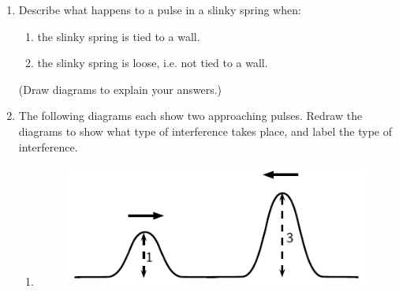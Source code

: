 \begin{enumerate}[noitemsep, label=\textbf{\arabic*}. ]
\begin{figure}[H]
\begin{center}
      \vspace{2pt}
    \vspace{.1in}
    
    \end{center}

 \end{figure}   

    \addtocounter{footnote}{-0}
            \label{m38802*uid76}\item Describe what happens to a pulse in a slinky spring when:
\label{m38802*id316845}\begin{enumerate}[noitemsep, label=\textbf{\alph*}. ] 
            \label{m38802*uid77}\item the slinky spring is tied to a wall.
\label{m38802*uid78}\item the slinky spring is loose, i.e. not tied to a wall.
\end{enumerate}
        
(Draw diagrams to explain your answers.)\newline
            
\label{m38802*uid79}\item The following diagrams each show two approaching pulses. Redraw the diagrams to show what type of interference takes place, and label the type of interference.
\label{m38802*id316891}\begin{enumerate}[noitemsep, label=\textbf{\alph*}. ] 
            \label{m38802*uid80}\item 
    \setcounter{subfigure}{0}


	\begin{figure}[H] %
    \begin{center}
    \label{m38802*id316905!!!underscore!!!media}\label{m38802*id316905!!!underscore!!!printimage}\includegraphics{col11305.imgs/m38802_PG10C4_032.png} %
        
      \vspace{2pt}
    \vspace{.1in}
    

\end{center}
\end{figure}
\end{enumerate}
\end{enumerate}
